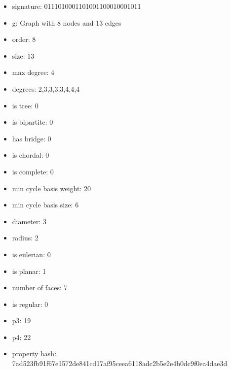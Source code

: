 \begin{itemize}
\item signature: 0111010001101001100010001011
\item g: Graph with 8 nodes and 13 edges
\item order: 8
\item size: 13
\item max degree: 4
\item degrees: 2,3,3,3,3,4,4,4
\item is tree: 0
\item is bipartite: 0
\item has bridge: 0
\item is chordal: 0
\item is complete: 0
\item min cycle basis weight: 20
\item min cycle basis size: 6
\item diameter: 3
\item radius: 2
\item is eulerian: 0
\item is planar: 1
\item number of faces: 7
\item is regular: 0
\item p3: 19
\item p4: 22
\item property hash: 7ad523fb91f67e1572de841cd17af95ceea6118adc2b5e2e4b0dc9f0ea4dae3d
\end{itemize}
\newpage
\begin{figure}
\end{figure}

